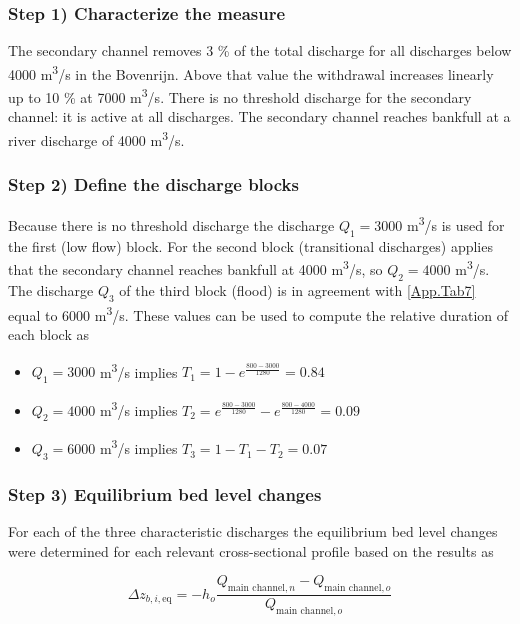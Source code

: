 \subsubsection*{Step 1) Characterize the measure}

The secondary channel removes 3 \% of the total discharge for all discharges below 4000 m\textsuperscript{3}/s in the Bovenrijn.
Above that value the withdrawal increases linearly up to 10 \% at 7000 m\textsuperscript{3}/s.
There is no threshold discharge for the secondary channel: it is active at all discharges.
The secondary channel reaches bankfull at a river discharge of 4000 m\textsuperscript{3}/s.

\subsubsection*{Step 2) Define the discharge blocks}

Because there is no threshold discharge the discharge $Q_1 = 3000$ m\textsuperscript{3}/s is used for the first (low flow) block.
For the second block (transitional discharges) applies that the secondary channel reaches bankfull at 4000 m\textsuperscript{3}/s, so $Q_2 = 4000$ m\textsuperscript{3}/s.
The discharge $Q_3$ of the third block (flood) is in agreement with \autoref{App.Tab7} equal to 6000 m\textsuperscript{3}/s.
These values can be used to compute the relative duration of each block as

\begin{itemize}
\item $Q_1=3000$ m\textsuperscript{3}/s implies $T_1 = 1-e^{\frac{800-3000}{1280}} = 0.84$
\item $Q_2=4000$ m\textsuperscript{3}/s implies $T_2 = e^{\frac{800-3000}{1280}} - e^{\frac{800-4000}{1280}} = 0.09$
\item $Q_3=6000$ m\textsuperscript{3}/s implies $T_3 = 1-T_1-T_2 = 0.07$
\end{itemize}

\subsubsection*{Step 3) Equilibrium bed level changes}

For each of the three characteristic discharges the equilibrium bed level changes were determined for each relevant cross-sectional profile based on the \sobek results as

\begin{equation}
\Delta z_{b,i,\text{eq}} = -h_o \frac{Q_{\text{main channel},n} - Q_{\text{main channel},o}}{Q_{\text{main channel},o}}
\end{equation}

